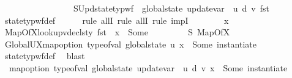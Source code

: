 \begin{isabellebody}
\ \ \ \ \ \ \isamarkupfalse%
\isanewline
\ \ \ \ \isamarkupfalse%
\isanewline
\ \ \ \ \isamarkupfalse%
\ S{}Upd{\isacharcolon}{\kern0pt}{\isachardoublequoteopen}state{\isacharunderscore}{\kern0pt}typ{\isacharunderscore}{\kern0pt}wf\ {\isasymOmega}\ {\isacharparenleft}{\kern0pt}global{\isacharunderscore}{\kern0pt}state\ {\isacharparenleft}{\kern0pt}update{\isacharunderscore}{\kern0pt}var\ {\isasymLambda}{\isacharprime}{\kern0pt}\ u\ d\ v{\isacharparenright}{\kern0pt}{\isacharparenright}{\kern0pt}\ {\isacharparenleft}{\kern0pt}fst\ {\isasymLambda}{\isacharprime}{\kern0pt}{\isacharparenright}{\kern0pt}{\isachardoublequoteclose}\isanewline
\ \ \ \ \ \ \isamarkupfalse%
\ state{\isacharunderscore}{\kern0pt}typ{\isacharunderscore}{\kern0pt}wf{\isacharunderscore}{\kern0pt}def\isanewline
\ \ \ \ \isamarkupfalse%
\ {\isacharparenleft}{\kern0pt}rule\ allI{\isacharcomma}{\kern0pt}\ rule\ allI{\isacharcomma}{\kern0pt}\ rule\ impI{\isacharparenright}{\kern0pt}\isanewline
\ \ \ \ \ \ \isamarkupfalse%
\ x\ {\isasymtau}{\isacharprime}{\kern0pt}\isanewline
\ \ \ \ \ \ \isamarkupfalse%
\ MapOfX{\isacharcolon}{\kern0pt}{\isachardoublequoteopen}lookup{\isacharunderscore}{\kern0pt}vdecls{\isacharunderscore}{\kern0pt}ty\ {\isacharparenleft}{\kern0pt}fst\ {\isasymLambda}{\isacharprime}{\kern0pt}{\isacharparenright}{\kern0pt}\ x\ {\isacharequal}{\kern0pt}\ Some\ {\isasymtau}{\isacharprime}{\kern0pt}{\isachardoublequoteclose}\isanewline
\ \ \ \ \ \ \isamarkupfalse%
\ S{}\ MapOfX\ \isamarkupfalse%
\ GlobalUX{\isacharcolon}{\kern0pt}{\isachardoublequoteopen}map{\isacharunderscore}{\kern0pt}option\ type{\isacharunderscore}{\kern0pt}of{\isacharunderscore}{\kern0pt}val\ {\isacharparenleft}{\kern0pt}global{\isacharunderscore}{\kern0pt}state\ u\ x{\isacharparenright}{\kern0pt}\ {\isacharequal}{\kern0pt}\ Some\ {\isacharparenleft}{\kern0pt}instantiate\ {\isasymOmega}\ {\isasymtau}{\isacharprime}{\kern0pt}{\isacharparenright}{\kern0pt}{\isachardoublequoteclose}\ \isamarkupfalse%
\ state{\isacharunderscore}{\kern0pt}typ{\isacharunderscore}{\kern0pt}wf{\isacharunderscore}{\kern0pt}def\ \isamarkupfalse%
\ blast\isanewline
\ \ \ \ \ \ \isamarkupfalse%
\ \ {\isachardoublequoteopen}map{\isacharunderscore}{\kern0pt}option\ type{\isacharunderscore}{\kern0pt}of{\isacharunderscore}{\kern0pt}val\ {\isacharparenleft}{\kern0pt}global{\isacharunderscore}{\kern0pt}state\ {\isacharparenleft}{\kern0pt}update{\isacharunderscore}{\kern0pt}var\ {\isasymLambda}{\isacharprime}{\kern0pt}\ u\ d\ v{\isacharparenright}{\kern0pt}\ x{\isacharparenright}{\kern0pt}\ {\isacharequal}{\kern0pt}\ Some\ {\isacharparenleft}{\kern0pt}instantiate\ {\isasymOmega}\ {\isasymtau}{\isacharprime}{\kern0pt}{\isacharparenright}{\kern0pt}{\isachardoublequoteclose}\isanewline

\end{isabellebody}
